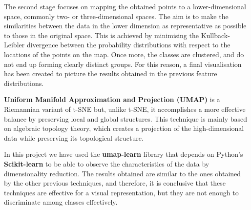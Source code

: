 The second stage focuses on mapping the obtained points to a lower-dimensional space, commonly two- or three-dimensional spaces. The aim is to make the similarities between the data in the lower dimension as representative as possible to those in the original space. This is achieved by minimising the Kullback-Leibler divergence between the probability distributions with respect to the locations of the points on the map. Once more, the classes are clustered, and do not end up forming clearly distinct groups.  For this reason, a final visualisation has been created to picture the results obtained in the previous feature distributions. 

\textbf{Uniform Manifold Approximation and Projection (UMAP)} is a Riemannian variant of t-SNE but, unlike t-SNE, it accomplishes a more effective balance by preserving local and global structures. This technique is mainly based on algebraic topology theory, which creates a projection of the high-dimensional data while preserving its topological structure. 

In this project we have used the \textbf{umap-learn} library that depends on Python's \textbf{Scikit-learn} to be able to observe the characteristics of the data by dimensionality reduction. The results obtained are similar to the ones obtained by the other previous techniques, and therefore, it is conclusive that these techniques are effective for a visual representation, but they are not enough to discriminate among classes effectively.

